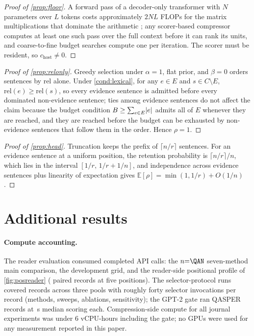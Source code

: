 \documentclass[pdflatex,sn-basic]{sn-jnl}
\DeclarePairedDelimiter\abs{\lvert}{\rvert}
\theoremstyle{remark}
\begin{document}
\begin{appendices}
\begin{proof}[Proof of \autoref{prop:floor}]
A forward pass of a decoder-only transformer with $N$ parameters over
$L$ tokens costs approximately $2NL$ FLOPs for the matrix
multiplications that dominate the arithmetic
\citep{kaplan2020scaling}; any scorer-based compressor computes at
least one such pass over the full context before it can rank its
units, and coarse-to-fine budget searches compute one per iteration.
The scorer must be resident, so $c_{\mathrm{host}} \ne 0$.
\end{proof}

\begin{proof}[Proof of \autoref{prop:relonly}]
Greedy selection under $\alpha = 1$, flat prior, and $\beta = 0$
orders sentences by $\mathrm{rel}$ alone. Under
\autoref{cond:lexical}, for any $e \in E$ and
$s \in C \setminus E$, $\mathrm{rel}(e) \ge \mathrm{rel}(s)$, so every
evidence sentence is admitted before every dominated non-evidence
sentence; ties among evidence sentences do not affect the claim
because the budget condition
$B \ge \sum_{e \in E} \abs{e}$ admits all of $E$ whenever they are
reached, and they are reached before the budget can be exhausted by
non-evidence sentences that follow them in the order. Hence $\rho=1$.
\end{proof}

\begin{proof}[Proof of \autoref{prop:head}]
Truncation keeps the prefix of $\lceil n/r \rceil$ sentences. For an
evidence sentence at a uniform position, the retention probability is
$\lceil n/r \rceil / n$, which lies in the interval
$[1/r,\, 1/r + 1/n]$, and independence
across evidence sentences plus linearity of expectation gives
$\mathbb{E}[\rho] = \min(1, 1/r) + O(1/n)$.
\end{proof}

\section{Additional results}
\label{app:results}

\paragraph{Compute accounting.}
The reader evaluation consumed \TotalCalls{} completed API calls:
the $n{=}\QAN$ seven-method main comparison, the development grid,
and the reader-side positional profile of \autoref{fig:posreader}
(\PosRUPairs{} paired records at five positions). The
selector-protocol
runs covered \TotalRecords{} records across three pools with roughly
forty selector invocations per record (methods, sweeps, ablations,
sensitivity); the GPT-2 gate ran \GateN{} QASPER records at
\GateLatMedS\,s median scoring each. Compression-side compute for all
journal experiments was under 6 vCPU-hours including the gate; no
GPUs were used for any measurement reported in this paper.


\end{appendices}
\end{document}
